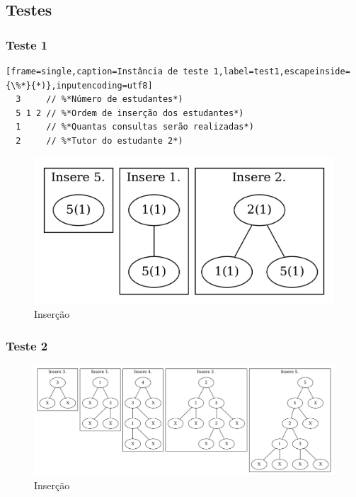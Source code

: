 \subsection{Testes}\label{sec:testes}
\subsubsection{Teste 1}
\begin{lstlisting}[frame=single,caption=Instância de teste 1,label=test1,escapeinside={\%*}{*)},inputencoding=utf8]
  3     // %*Número de estudantes*)
  5 1 2 // %*Ordem de inserção dos estudantes*)
  1     // %*Quantas consultas serão realizadas*)
  2     // %*Tutor do estudante 2*)
\end{lstlisting}

\begin{figure}[htb]
  \centering
  \includegraphics[width=0.5\linewidth]{test1.png}
  \caption{Inserção}
  \label{fig:test1}
\end{figure}

\subsubsection{Teste 2}
\begin{figure}[htb]
  \centering
  \includegraphics[width=\linewidth]{test2.png}
  \caption{Inserção}
  \label{fig:test1}
\end{figure}